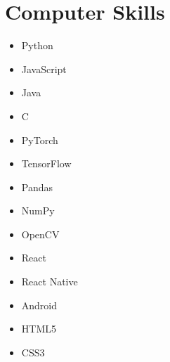 \documentclass[11pt,a4paper,roman]{moderncv} %
\newcommand*{\authorimg}[1]{%
	\raisebox{-.3\baselineskip}{%
		\texttt{[image: \#1]}%
	}%
}
\begin{document}
\section{Computer Skills}
\begin{adjustwidth}{-0.5in}{0in}
	\begin{cvcolumns}
		{\begin{itemize}
				\vspace{0.1em}
				\setlength\itemsep{0.3em}
		  		\item \authorimg{pictures/python.png} Python
		  		\item \authorimg{pictures/js.png} JavaScript
		  		\item \authorimg{pictures/java.png} Java
		  		\item \authorimg{pictures/cpp.png} C\raisebox{1pt}{\small++}
	  		\end{itemize}}
	
		{\begin{itemize}
				\vspace{0.1em}
				\setlength\itemsep{0.3em}
				\item \authorimg{pictures/pytorch.png} PyTorch
				\item \authorimg{pictures/tensorflow.png} TensorFlow
				\item \authorimg{pictures/pandas.png} Pandas
				\item \authorimg{pictures/numpy.png} NumPy
				\item \authorimg{pictures/opencv.png} OpenCV
		 	\end{itemize}}
	 
		 {\begin{itemize}
		 		\vspace{0.1em}
		 		\setlength\itemsep{0.3em}
		 		\item \authorimg{pictures/react.jpg} React
		 		\item \authorimg{pictures/react.jpg} React Native
		 		\item \authorimg{pictures/android.png} Android
		 		\item \authorimg{pictures/html5.png} HTML5
		 		\item \authorimg{pictures/css3.png} CSS3
		 \end{itemize}}
	 	

\end{cvcolumns}
\end{adjustwidth}
\end{document}
